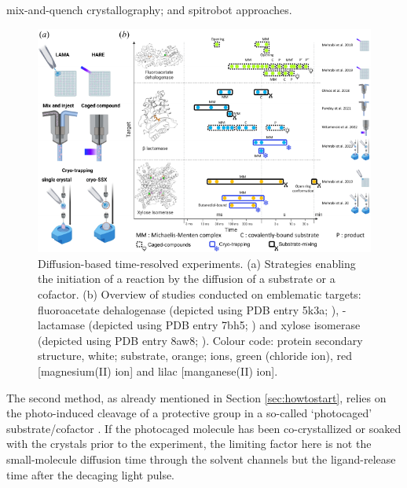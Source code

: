 mix-and-quench crystallography; \cite{clingerMillisecondMixandquenchCrystallography2021} and spitrobot \parencite{mehrabiMillisecondCryotrappingSpitrobot2023} approaches.

\begin{figure}[H] %
    \centering
    \noindent \includegraphics[width=\textwidth]{images/Introduction/Figure7_diffusion.pdf}
    \hfill
    \caption{Diffusion-based time-resolved experiments. (a) Strategies enabling the initiation of a reaction by the diffusion of a substrate or a cofactor. (b) Overview of studies conducted on emblematic targets: fluoroacetate dehalogenase (depicted using PDB entry 5k3a; \cite{mehrabiLiquidApplicationMethod2019}), \textBeta-lactamase (depicted using PDB entry 7bh5; \cite{butrynOndemandDropondropMethod2021}) and xylose isomerase (depicted using PDB entry 8aw8; \cite{mehrabiMillisecondCryotrappingSpitrobot2023}). Colour code: protein secondary structure, white; substrate, orange; ions, green (chloride ion), red [magnesium(II) ion] and lilac [manganese(II) ion].}
    \label{fig:Figure7}
\end{figure}

The second method, as already mentioned in Section \ref{sec:howtostart}, relies on the photo-induced cleavage of a protective group in a so-called ‘photocaged’ substrate/cofactor \parencite{monteiroUsingPhotocagingFast2021}. If the photocaged molecule has been co-crystallized or soaked with the crystals prior to the experiment, the limiting factor here is not the small-molecule diffusion time through the solvent channels but the ligand-release time after the decaging light pulse.

